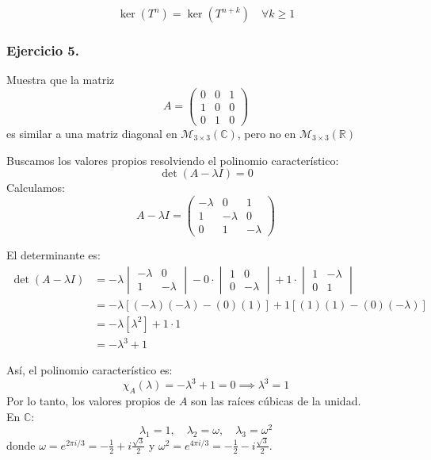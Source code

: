 \documentclass{article}
\theoremstyle{nonumberplain}
\begin{document}
\[
\boxed{
\operatorname{ker}(T^{n}) = \operatorname{ker}(T^{n+k}) \quad \forall k \geq 1
}
\]

\subsubsection*{Ejercicio 5.} Muestra que la matriz
\[
A=\left(\begin{array}{lll}
0 & 0 & 1 \\
1 & 0 & 0 \\
0 & 1 & 0
\end{array}\right)
\]
es similar a una matriz diagonal en \( \mathcal{M}_{3 \times 3}(\mathbb{C}) \), pero no en \( \mathcal{M}_{3 \times 3}(\mathbb{R}) \)

Buscamos los valores propios resolviendo el polinomio característico:
\[
\det(A - \lambda I) = 0
\]
Calculamos:
\[
A - \lambda I = \begin{pmatrix}
-\lambda & 0 & 1 \\
1 & -\lambda & 0 \\
0 & 1 & -\lambda
\end{pmatrix}
\]

El determinante es:
\[
\begin{aligned}
\det(A - \lambda I)
&= -\lambda \begin{vmatrix}
-\lambda & 0 \\
1 & -\lambda
\end{vmatrix}
- 0 \cdot \begin{vmatrix}
1 & 0 \\
0 & -\lambda
\end{vmatrix}
+ 1 \cdot \begin{vmatrix}
1 & -\lambda \\
0 & 1
\end{vmatrix}\\
&= -\lambda [(-\lambda)(-\lambda) - (0)(1)] + 1 [(1)(1) - (0)(-\lambda)]\\
&= -\lambda [\lambda^2] + 1 \cdot 1\\
&= -\lambda^3 + 1
\end{aligned}
\]

Así, el polinomio característico es:
\[
\chi_A(\lambda) = -\lambda^3 + 1 = 0 \implies \lambda^3 = 1
\]
Por lo tanto, los valores propios de \( A \) son las raíces cúbicas de la unidad. \\
En \( \mathbb{C} \):
\[
\lambda_1 = 1, \quad \lambda_2 = \omega, \quad \lambda_3 = \omega^2
\]
donde \( \omega = e^{2\pi i/3} = -\frac{1}{2} + i \frac{\sqrt{3}}{2} \) y \( \omega^2 = e^{4\pi i/3} = -\frac{1}{2} - i \frac{\sqrt{3}}{2} \). \\
\end{document}
